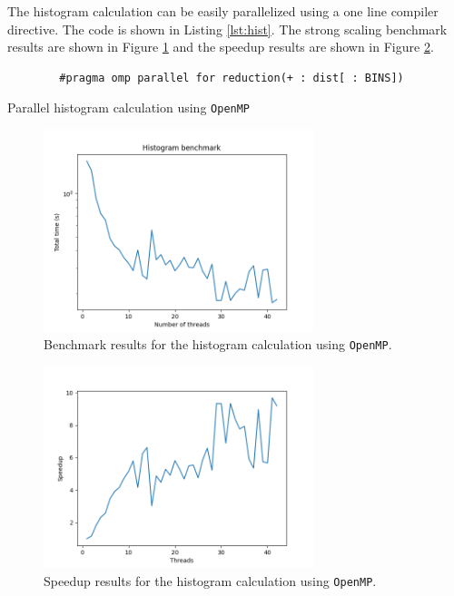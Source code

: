 \documentclass[unicode,11pt,a4paper,oneside,numbers=endperiod,openany]{scrartcl}
\begin{document}
The histogram calculation can be easily parallelized using a one line compiler directive. The code is shown in Listing \ref{lst:hist}. The strong scaling benchmark results are shown in Figure \ref{fig:hist_benchmark} and the speedup results are shown in Figure \ref{fig:hist_speedup}.

\begin{listing}[h!t]
    \begin{verbatim}
        #pragma omp parallel for reduction(+ : dist[ : BINS])
    \end{verbatim}
    \caption{Parallel histogram calculation using \texttt{OpenMP}}
    \label{lst:hist}
\end{listing}

\begin{figure}[h]
    \centering
    \includegraphics[width=0.7\textwidth]{../code/hist/benchmark.png}
    \caption{Benchmark results for the histogram calculation using \texttt{OpenMP}.}
    \label{fig:hist_benchmark}
\end{figure}

\begin{figure}[h]
    \centering
    \includegraphics[width=0.7\textwidth]{../code/hist/speedup.png}
    \caption{Speedup results for the histogram calculation using \texttt{OpenMP}.}
    \label{fig:hist_speedup}
\end{figure}
\end{document}
